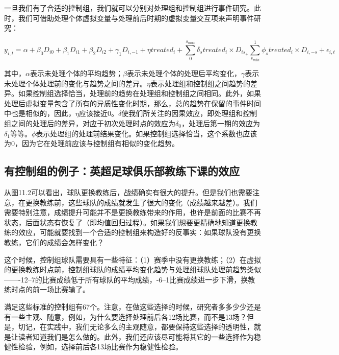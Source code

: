 \documentclass[cn,12pt,math=newtx,citestyle=gb7714-2015,bibstyle=gb7714-2015]{elegantbook}
\begin{document}
	   一旦我们有了合适的控制组，我们就可以分别对处理组和控制组进行事件研究。此时，我们可借助处理个体虚拟变量与处理前后时期的虚拟变量交互项来声明事件研究：
	   
	    \begin{equation}
	    	 y_{i,t} = \alpha + \beta_0 D_{i0} + \beta_1 D_{i1} + \beta_2 D_{i2} + \gamma_1 D_{i,-1}+\eta treated_i+\sum_0^{s_{max}}\delta_s treated_i \times D_{is}_+\sum_{s_{min}}^1 \phi_s treated_i \times D_{i,-s}+\epsilon_{i,t}
	    \end{equation}
	    
	    其中，$ \alpha $表示未处理个体的平均趋势；$\beta$表示未处理个体的处理后平均变化，$\gamma$表示未处理个体处理前的变化与趋势之间的差异。$\eta$表示处理组和控制组之间趋势的差异。如果控制组选择恰当，处理前的趋势在处理组和控制组之间相同。此外，如果处理后虚拟变量包含了所有的异质性变化时期，那么，总的趋势在保留的事件时间中也是相似的，因此，$\eta$应该接近0。$\delta$使我们所关注的因果效应，即处理组和控制组之间的处理后的差异，对应于初次处理时点的效应为$\delta_0$，处理后第一期的效应为$\delta_1$等等。$\phi$表示处理组的处理前结果变化。如果控制组选择恰当，这个系数也应该为0，因为它在处理前应该与控制组有相似的变化趋势。
	    
	    \subsection*{有控制组的例子：英超足球俱乐部教练下课的效应}
	    
	    从图11.2可以看出，球队更换教练后，战绩确实有很大的提升。但是我们也需要注意，在更换教练前，这些球队的成绩就发生了很大的变化（成绩越来越差）。我们需要特别注意，成绩提升可能并不是更换教练带来的作用，也许是前面的比赛不再状态，后面状态有恢复了（即均值回归过程）。如果我们想要更精确地知道更换教练的效应，可能就要找到一个合适的控制组来构造好的反事实：如果球队没有更换教练，它们的成绩会怎样变化？
	    
	    这个时候，控制组球队需要具有一些特征：（1）赛季中没有更换教练；（2）在虚拟的更换教练时点前，控制组球队的成绩平均变化趋势与处理组球队处理前趋势类似——-12--7的比赛成绩低于所有球队的平均成绩，-6--1比赛成绩进一步下滑，换教练时点的前一场比赛输了。
	    
	    满足这些标准的控制组有67个。注意，在做这些选择的时候，研究者多多少少还是有一些主观、随意，例如，为什么要选择处理前后各12场比赛，而不是13场？但是，切记，在实践中，我们无论多么的主观随意，都要保持这些选择的透明性，就是让读者知道我们是怎么做的。此外，我们还应该尽可能将其它的一些选择作为稳健性检验，例如，选择前后各13场比赛作为稳健性检验。
	    
\end{document}
